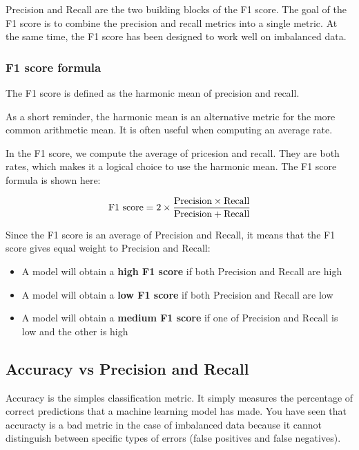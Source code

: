 Precision and Recall are the two building blocks of the F1 score. The
goal of the F1 score is to combine the precision and recall metrics into
a single metric. At the same time, the F1 score has been designed to
work well on imbalanced data.

\hypertarget{f1-score-formula}{%
\subsubsection{F1 score formula}\label{f1-score-formula}}

The F1 score is defined as the harmonic mean of precision and recall.

As a short reminder, the harmonic mean is an alternative metric for the
more common arithmetic mean. It is often useful when computing an
average rate.

In the F1 score, we compute the average of pricesion and recall. They
are both rates, which makes it a logical choice to use the harmonic
mean. The F1 score formula is shown here:

\begin{align*}
\textnormal{F1 score} = 2 \times \frac{\textnormal{Precision} \times \textnormal{Recall}}{\textnormal{Precision} + \textnormal{Recall}}
\end{align*}

Since the F1 score is an average of Precision and Recall, it means that
the F1 score gives equal weight to Precision and Recall:

\begin{itemize}
\item
  A model will obtain a \textbf{high F1 score} if both Precision and
  Recall are high
\item
  A model will obtain a \textbf{low F1 score} if both Precision and
  Recall are low
\item
  A model will obtain a \textbf{medium F1 score} if one of Precision and
  Recall is low and the other is high
\end{itemize}

\hypertarget{accuracy-vs-precision-and-recall}{%
\subsection{Accuracy vs Precision and
Recall}\label{accuracy-vs-precision-and-recall}}

Accuracy is the simples classification metric. It simply measures the
percentage of correct predictions that a machine learning model has
made. You have seen that accuracty is a bad metric in the case of
imbalanced data because it cannot distinguish between specific types of
errors (false positives and false negatives).

